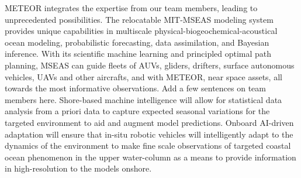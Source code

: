 METEOR integrates the expertise from our team members, leading to unprecedented possibilities. The relocatable MIT-MSEAS modeling system provides unique capabilities in multiscale physical-biogeochemical-acoustical ocean modeling, probabilistic forecasting, data assimilation, and Bayesian inference. With its scientific machine learning and principled optimal path planning, MSEAS can guide fleets of AUVs, gliders, drifters, surface autonomous vehicles, UAVs and other aircrafts, and with METEOR, near space assets, all towards the most informative observations.
\color{red} Add a few sentences on team members here.
\color{black}
%
Shore-based machine intelligence will allow for statistical data
analysis from a priori data to capture expected seasonal variations for
the targeted environment to aid and augment model predictions. Onboard
AI-driven adaptation will ensure that in-situ robotic vehicles will
intelligently adapt to the dynamics of the environment to make fine
scale observations of targeted coastal ocean phenomenon in the upper
water-column as a means to provide information in high-resolution to
the models onshore. 



